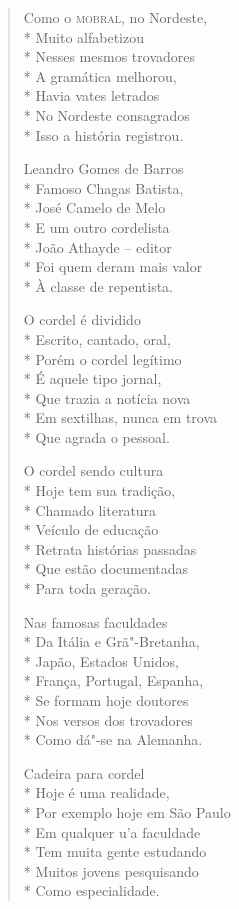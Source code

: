\begin{verse}
Como o \textsc{mobral}, no Nordeste,\\*
Muito alfabetizou\\*
Nesses mesmos trovadores\\*
A gramática melhorou,\\*
Havia vates letrados\\*
No Nordeste consagrados\\*
Isso a história registrou.

Leandro Gomes de Barros\\*
Famoso Chagas Batista,\\*
José Camelo de Melo\\*
E um outro cordelista\\*
João Athayde --  editor\\*
Foi quem deram mais valor\\*
À classe de repentista.

O cordel é dividido\\*
Escrito, cantado, oral,\\*
Porém o cordel legítimo\\*
É aquele tipo jornal,\\*
Que trazia a notícia nova\\*
Em sextilhas, nunca em trova\\*
Que agrada o pessoal.

O cordel sendo cultura\\*
Hoje tem sua tradição,\\*
Chamado literatura\\*
Veículo de educação\\*
Retrata histórias passadas\\*
Que estão documentadas\\*
Para toda geração.

Nas famosas faculdades\\*
Da Itália e Grã"-Bretanha,\\*
Japão, Estados Unidos,\\*
França, Portugal, Espanha,\\*
Se formam hoje doutores\\*
Nos versos dos trovadores\\*
Como dá"-se na Alemanha.

Cadeira para cordel\\*
Hoje é uma realidade,\\*
Por exemplo hoje em São Paulo\\*
Em qualquer u'a faculdade\\*
Tem muita gente estudando\\*
Muitos jovens pesquisando\\*
Como especialidade.


\end{verse}
